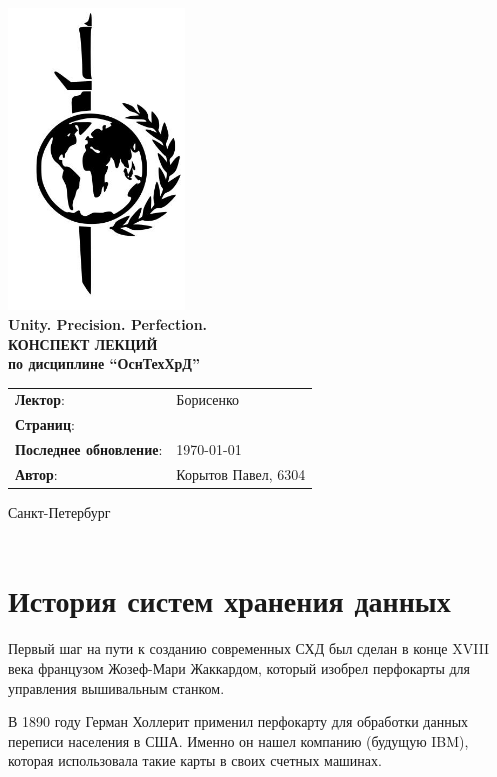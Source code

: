 \documentclass[a4paper, 14pt]{extarticle}
\begin{document}
	\begin{titlepage}
		{\centering
			{\bfseries
				\includegraphics[height=8cm]{logo.jpeg}\\
				Unity. Precision. Perfection.\\
				\vspace{3.5cm}
				\uppercase{Конспект лекций} \\
				по дисциплине \enquote{ОснТехХрД}\\
			}
			\vspace{\fill}
		}
		\begin{tabular}{l l}
			\textbf{Лектор}: & Борисенко\\
			\textbf{Страниц}: & \pageref{LastPage}\\
			\textbf{Последнее обновление}: & \today{}\\ 
			\textbf{Автор}: & Корытов Павел, 6304\\
		\end{tabular}
	
		\vspace{2cm}
		{\centering
			Санкт-Петербург \\
			\the\year\\
		}
	\end{titlepage}
	
\tableofcontents
\newpage

\section{История систем хранения данных}
Первый шаг на пути к созданию современных СХД был сделан в конце XVIII века французом Жозеф-Мари Жаккардом, который изобрел перфокарты для управления вышивальным станком.
 
В 1890 году Герман Холлерит применил перфокарту для обработки данных переписи населения в США. Именно он нашел компанию (будущую IBM), которая использовала такие карты в своих счетных машинах. 
\end{document}
